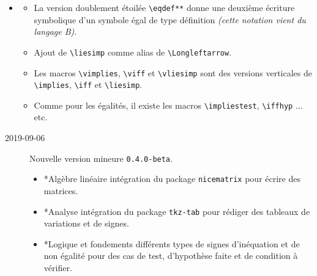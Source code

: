 \documentclass[12pt,a4paper]{book}
\makeatletter
\newcommand\env[1]{\texttt{#1}}
\newcommand\macro[1]{\env{\textbackslash{}#1}}
\theoremstyle{definition}
\newcommand\topic{\@ifstar{\@topic@star}{\@topic@no@star}}
\newcommand\@topic@no@star[1]{%
	\textbf{\textsc{#1}.}%
}
\newcommand\@topic@star[1]{%
	\textbf{\textsc{#1} :}%
}
\makeatother
\begin{document}
{{\begin{description}
\begin{itemize}[itemsep=.5em]
\begin{itemize}[itemsep=.5em]
            \item \macro{parallel} utilise des obliques pour symboliser le parallélisme au lieu de barres verticales.
        \end{itemize}
    
    
    
    
        \item \topic{Logique}
        \begin{itemize}[itemsep=.5em]
            \item La version doublement étoilée \macro{eqdef**} donne une deuxième écriture symbolique d'un symbole égal de type définition \emph{(cette notation vient du langage B)}.
    
            \item Ajout de \macro{liesimp} comme alias de \macro{Longleftarrow}.
    
            \item Les macros \macro{vimplies}, \macro{viff} et \macro{vliesimp} sont des versions verticales de \macro{implies}, \macro{iff} et \macro{liesimp}.
    
            \item Comme pour les égalités, il existe les macros \macro{impliestest}, \macro{iffhyp} ... etc.
        \end{itemize}
    \end{itemize}
\end{description}

\begin{description}    \item[2019-09-06] Nouvelle version mineure \verb+0.4.0-beta+.
    
    \begin{itemize}[itemsep=.5em]
        \item \topic*{Algèbre linéaire}
              intégration du package \verb+nicematrix+ pour écrire des matrices.
    
    
    
    
        \item \topic*{Analyse}
              intégration du package \verb+tkz-tab+ pour rédiger des tableaux de variations et de signes.
    
    
    
    
        \item \topic*{Logique et fondements}
              différents types de signes d'inéquation et de non égalité pour des cas de test, d'hypothèse faite et de condition à vérifier.
    

\end{itemize}
\end{description}}}
\end{document}
